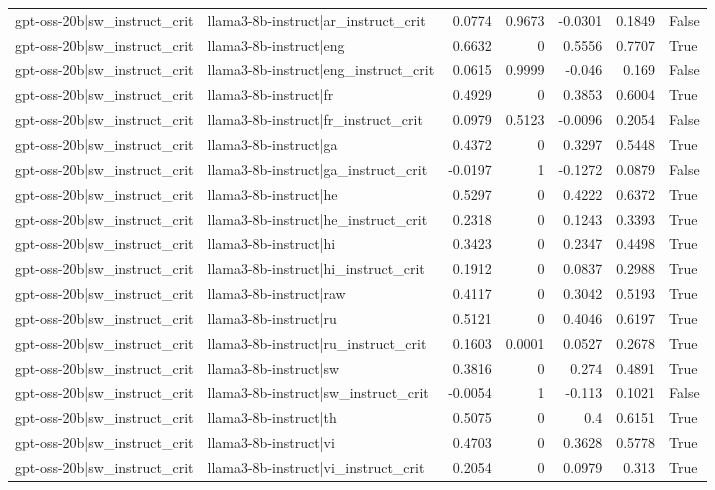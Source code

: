 \begin{table}
\begin{tabular}{l l r r r r l}
gpt-oss-20b|sw_instruct_crit & llama3-8b-instruct|ar_instruct_crit & 0.0774 & 0.9673 & -0.0301 & 0.1849 & False \\
gpt-oss-20b|sw_instruct_crit & llama3-8b-instruct|eng & 0.6632 & 0 & 0.5556 & 0.7707 & True \\
gpt-oss-20b|sw_instruct_crit & llama3-8b-instruct|eng_instruct_crit & 0.0615 & 0.9999 & -0.046 & 0.169 & False \\
gpt-oss-20b|sw_instruct_crit & llama3-8b-instruct|fr & 0.4929 & 0 & 0.3853 & 0.6004 & True \\
gpt-oss-20b|sw_instruct_crit & llama3-8b-instruct|fr_instruct_crit & 0.0979 & 0.5123 & -0.0096 & 0.2054 & False \\
gpt-oss-20b|sw_instruct_crit & llama3-8b-instruct|ga & 0.4372 & 0 & 0.3297 & 0.5448 & True \\
gpt-oss-20b|sw_instruct_crit & llama3-8b-instruct|ga_instruct_crit & -0.0197 & 1 & -0.1272 & 0.0879 & False \\
gpt-oss-20b|sw_instruct_crit & llama3-8b-instruct|he & 0.5297 & 0 & 0.4222 & 0.6372 & True \\
gpt-oss-20b|sw_instruct_crit & llama3-8b-instruct|he_instruct_crit & 0.2318 & 0 & 0.1243 & 0.3393 & True \\
gpt-oss-20b|sw_instruct_crit & llama3-8b-instruct|hi & 0.3423 & 0 & 0.2347 & 0.4498 & True \\
gpt-oss-20b|sw_instruct_crit & llama3-8b-instruct|hi_instruct_crit & 0.1912 & 0 & 0.0837 & 0.2988 & True \\
gpt-oss-20b|sw_instruct_crit & llama3-8b-instruct|raw & 0.4117 & 0 & 0.3042 & 0.5193 & True \\
gpt-oss-20b|sw_instruct_crit & llama3-8b-instruct|ru & 0.5121 & 0 & 0.4046 & 0.6197 & True \\
gpt-oss-20b|sw_instruct_crit & llama3-8b-instruct|ru_instruct_crit & 0.1603 & 0.0001 & 0.0527 & 0.2678 & True \\
gpt-oss-20b|sw_instruct_crit & llama3-8b-instruct|sw & 0.3816 & 0 & 0.274 & 0.4891 & True \\
gpt-oss-20b|sw_instruct_crit & llama3-8b-instruct|sw_instruct_crit & -0.0054 & 1 & -0.113 & 0.1021 & False \\
gpt-oss-20b|sw_instruct_crit & llama3-8b-instruct|th & 0.5075 & 0 & 0.4 & 0.6151 & True \\
gpt-oss-20b|sw_instruct_crit & llama3-8b-instruct|vi & 0.4703 & 0 & 0.3628 & 0.5778 & True \\
gpt-oss-20b|sw_instruct_crit & llama3-8b-instruct|vi_instruct_crit & 0.2054 & 0 & 0.0979 & 0.313 & True \\

\end{tabular}
\end{table}
